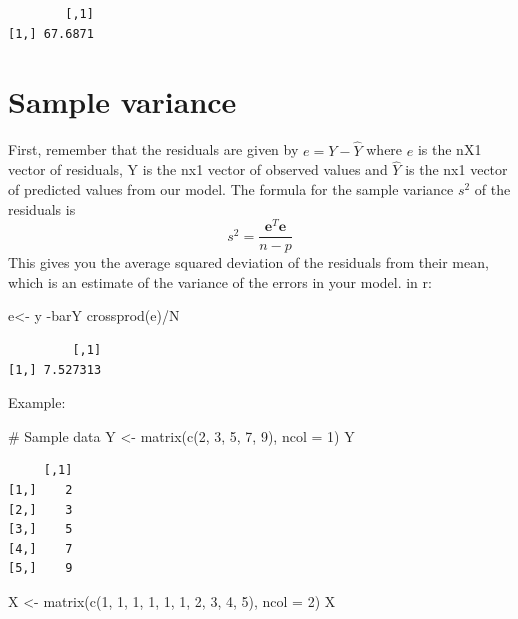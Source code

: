 \documentclass[
  letterpaper,
  DIV=11,
  numbers=noendperiod]{scrartcl}
\newenvironment{Shaded}{\begin{snugshade}}{\end{snugshade}}
\newcommand{\AttributeTok}[1]{\textcolor[rgb]{0.40,0.45,0.13}{#1}}
\newcommand{\CommentTok}[1]{\textcolor[rgb]{0.37,0.37,0.37}{#1}}
\newcommand{\DecValTok}[1]{\textcolor[rgb]{0.68,0.00,0.00}{#1}}
\newcommand{\FunctionTok}[1]{\textcolor[rgb]{0.28,0.35,0.67}{#1}}
\newcommand{\NormalTok}[1]{\textcolor[rgb]{0.00,0.23,0.31}{#1}}
\newcommand{\OtherTok}[1]{\textcolor[rgb]{0.00,0.23,0.31}{#1}}
\newcommand{\SpecialCharTok}[1]{\textcolor[rgb]{0.37,0.37,0.37}{#1}}
\begin{document}
\begin{verbatim}
        [,1]
[1,] 67.6871
\end{verbatim}

\section{Sample variance}\label{sample-variance}

First, remember that the residuals are given by \(e=Y-\hat{Y}\) where
\(e\) is the nX1 vector of residuals, Y is the nx1 vector of observed
values and \(\hat{Y}\) is the nx1 vector of predicted values from our
model. The formula for the sample variance \(s^2\) of the residuals is
\[
s^2 = \frac{\mathbf{e}^T \mathbf{e}}{n - p}
\] This gives you the average squared deviation of the residuals from
their mean, which is an estimate of the variance of the errors in your
model. in r:

\begin{Shaded}
\begin{Highlighting}[]
\NormalTok{e}\OtherTok{\textless{}{-}}\NormalTok{ y }\SpecialCharTok{{-}}\NormalTok{barY}
\FunctionTok{crossprod}\NormalTok{(e)}\SpecialCharTok{/}\NormalTok{N}
\end{Highlighting}
\end{Shaded}

\begin{verbatim}
         [,1]
[1,] 7.527313
\end{verbatim}

Example:

\begin{Shaded}
\begin{Highlighting}[]
\CommentTok{\# Sample data}
\NormalTok{Y }\OtherTok{\textless{}{-}} \FunctionTok{matrix}\NormalTok{(}\FunctionTok{c}\NormalTok{(}\DecValTok{2}\NormalTok{, }\DecValTok{3}\NormalTok{, }\DecValTok{5}\NormalTok{, }\DecValTok{7}\NormalTok{, }\DecValTok{9}\NormalTok{), }\AttributeTok{ncol =} \DecValTok{1}\NormalTok{)}
\NormalTok{Y}
\end{Highlighting}
\end{Shaded}

\begin{verbatim}
     [,1]
[1,]    2
[2,]    3
[3,]    5
[4,]    7
[5,]    9
\end{verbatim}

\begin{Shaded}
\begin{Highlighting}[]
\NormalTok{X }\OtherTok{\textless{}{-}} \FunctionTok{matrix}\NormalTok{(}\FunctionTok{c}\NormalTok{(}\DecValTok{1}\NormalTok{, }\DecValTok{1}\NormalTok{, }\DecValTok{1}\NormalTok{, }\DecValTok{1}\NormalTok{, }\DecValTok{1}\NormalTok{, }\DecValTok{1}\NormalTok{, }\DecValTok{2}\NormalTok{, }\DecValTok{3}\NormalTok{, }\DecValTok{4}\NormalTok{, }\DecValTok{5}\NormalTok{), }\AttributeTok{ncol =} \DecValTok{2}\NormalTok{)}
\NormalTok{X}
\end{Highlighting}
\end{Shaded}
\end{document}
